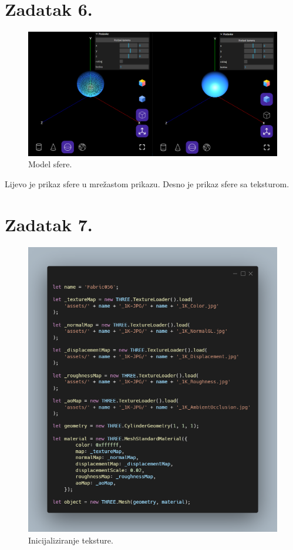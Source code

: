 \documentclass[a4paper,12pt]{article}
\begin{document}
\pagebreak

\section{Zadatak 6.}


\begin{figure}[ht]
    \centering
    \includegraphics[scale=0.5]{image/zadatak6.png}
    \caption{Model sfere.}
\end{figure}

Lijevo je prikaz sfere u mrežastom prikazu. Desno je prikaz sfere sa teksturom.

\pagebreak
\section{Zadatak 7.}
\begin{figure}[ht]
    \centering
    \includegraphics[scale=0.5]{image/zadatak7.png}
    \caption{Inicijaliziranje teksture.}
\end{figure}
\end{document}
